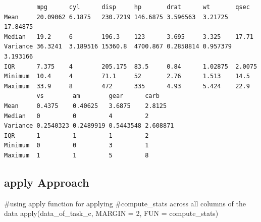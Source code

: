 \documentclass[
  letterpaper,
  DIV=11,
  numbers=noendperiod]{scrartcl}
\newenvironment{Shaded}{\begin{snugshade}}{\end{snugshade}}
\newcommand{\AttributeTok}[1]{\textcolor[rgb]{0.40,0.45,0.13}{#1}}
\newcommand{\CommentTok}[1]{\textcolor[rgb]{0.37,0.37,0.37}{#1}}
\newcommand{\DecValTok}[1]{\textcolor[rgb]{0.68,0.00,0.00}{#1}}
\newcommand{\FunctionTok}[1]{\textcolor[rgb]{0.28,0.35,0.67}{#1}}
\newcommand{\NormalTok}[1]{\textcolor[rgb]{0.00,0.23,0.31}{#1}}
\begin{document}
\begin{verbatim}
         mpg      cyl      disp     hp       drat      wt       qsec    
Mean     20.09062 6.1875   230.7219 146.6875 3.596563  3.21725  17.84875
Median   19.2     6        196.3    123      3.695     3.325    17.71   
Variance 36.3241  3.189516 15360.8  4700.867 0.2858814 0.957379 3.193166
IQR      7.375    4        205.175  83.5     0.84      1.02875  2.0075  
Minimum  10.4     4        71.1     52       2.76      1.513    14.5    
Maximum  33.9     8        472      335      4.93      5.424    22.9    
         vs        am        gear      carb    
Mean     0.4375    0.40625   3.6875    2.8125  
Median   0         0         4         2       
Variance 0.2540323 0.2489919 0.5443548 2.608871
IQR      1         1         1         2       
Minimum  0         0         3         1       
Maximum  1         1         5         8       
\end{verbatim}

\subsection{apply Approach}\label{apply-approach}

\begin{Shaded}
\begin{Highlighting}[]
\CommentTok{\#using apply function for applying}
\CommentTok{\#compute\_stats across all columns of the data}
\FunctionTok{apply}\NormalTok{(data\_of\_task\_c, }\AttributeTok{MARGIN =} \DecValTok{2}\NormalTok{, }\AttributeTok{FUN =}\NormalTok{ compute\_stats) }
\end{Highlighting}
\end{Shaded}
\end{document}
